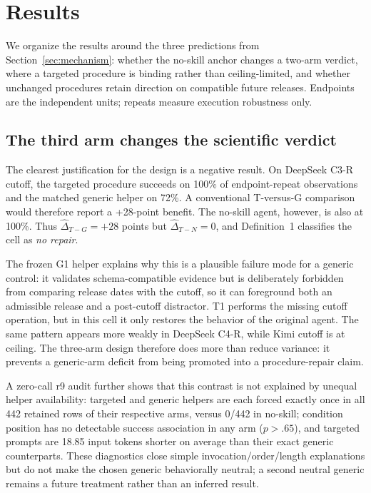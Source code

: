 \section{Results}
\label{sec:results}
We organize the results around the three predictions from Section~\ref{sec:mechanism}: whether the no-skill anchor changes a two-arm verdict, where a targeted procedure is binding rather than ceiling-limited, and whether unchanged procedures retain direction on compatible future releases. Endpoints are the independent units; repeats measure execution robustness only.

\subsection{The third arm changes the scientific verdict}
\label{sec:falsepositive}
The clearest justification for the design is a negative result. On DeepSeek C3-R cutoff, the targeted procedure succeeds on 100\% of endpoint-repeat observations and the matched generic helper on 72\%. A conventional T-versus-G comparison would therefore report a +28-point benefit. The no-skill agent, however, is also at 100\%. Thus $\widehat{\Delta}_{T-G}=+28$ points but $\widehat{\Delta}_{T-N}=0$, and Definition~1 classifies the cell as \emph{no repair}.

The frozen G1 helper explains why this is a plausible failure mode for a generic control: it validates schema-compatible evidence but is deliberately forbidden from comparing release dates with the cutoff, so it can foreground both an admissible release and a post-cutoff distractor. T1 performs the missing cutoff operation, but in this cell it only restores the behavior of the original agent. The same pattern appears more weakly in DeepSeek C4-R, while Kimi cutoff is at ceiling. The three-arm design therefore does more than reduce variance: it prevents a generic-arm deficit from being promoted into a procedure-repair claim.

A zero-call r9 audit further shows that this contrast is not explained by unequal helper availability: targeted and generic helpers are each forced exactly once in all 442 retained rows of their respective arms, versus 0/442 in no-skill; condition position has no detectable success association in any arm ($p>.65$), and targeted prompts are 18.85 input tokens shorter on average than their exact generic counterparts. These diagnostics close simple invocation/order/length explanations but do not make the chosen generic behaviorally neutral; a second neutral generic remains a future treatment rather than an inferred result.

